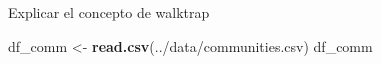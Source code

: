 \documentclass[
]{article}
\newenvironment{Shaded}{\begin{snugshade}}{\end{snugshade}}
\newcommand{\FunctionTok}[1]{\textcolor[rgb]{0.13,0.29,0.53}{\textbf{#1}}}
\newcommand{\NormalTok}[1]{#1}
\newcommand{\OtherTok}[1]{\textcolor[rgb]{0.56,0.35,0.01}{#1}}
\newcommand{\SpecialCharTok}[1]{\textcolor[rgb]{0.81,0.36,0.00}{\textbf{#1}}}
\newcommand{\StringTok}[1]{\textcolor[rgb]{0.31,0.60,0.02}{#1}}
\begin{document}
Explicar el concepto de walktrap

\begin{Shaded}
\end{Shaded}

\begin{Shaded}
\begin{Highlighting}[]
\NormalTok{df\_comm }\OtherTok{\textless{}{-}} \FunctionTok{read.csv}\NormalTok{(}\StringTok{\textquotesingle{}../data/communities.csv\textquotesingle{}}\NormalTok{)}
\NormalTok{df\_comm}
\end{Highlighting}
\end{Shaded}
\end{document}
